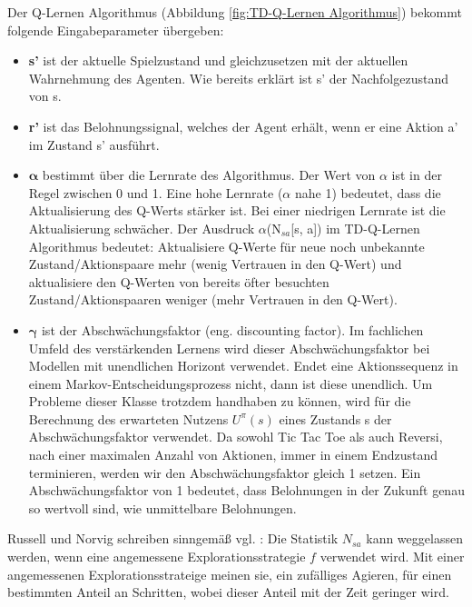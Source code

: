 Der Q-Lernen Algorithmus (Abbildung \ref{fig:TD-Q-Lernen Algorithmus}) bekommt folgende Eingabeparameter übergeben:

\begin{itemize}
\item \textbf{s'} ist der aktuelle Spielzustand und gleichzusetzen mit der aktuellen Wahrnehmung des Agenten. Wie bereits erklärt ist s' der Nachfolgezustand von s.

\item \textbf{r'} ist das Belohnungssignal, welches der Agent erhält, wenn er eine Aktion a' im Zustand s' ausführt. 

\item $\boldsymbol{\alpha}$ bestimmt über die Lernrate des Algorithmus. Der Wert von $\alpha$ ist in der Regel zwischen 0 und 1. Eine hohe Lernrate ($\alpha$ nahe 1) bedeutet, dass die Aktualisierung des Q-Werts stärker ist. Bei einer niedrigen Lernrate ist die Aktualisierung schwächer. Der Ausdruck $\alpha$(N$_{sa}$[s, a]) im TD-Q-Lernen Algorithmus bedeutet: Aktualisiere Q-Werte für neue noch unbekannte Zustand/Aktionspaare mehr (wenig Vertrauen in den Q-Wert) und aktualisiere den Q-Werten von bereits öfter besuchten Zustand/Aktionspaaren weniger (mehr Vertrauen in den Q-Wert). 
\newpage


\item $\boldsymbol{\gamma}$ ist der Abschwächungsfaktor (eng. discounting factor). Im fachlichen Umfeld des verstärkenden Lernens wird dieser Abschwächungsfaktor bei Modellen mit unendlichen Horizont verwendet. Endet eine Aktionssequenz in einem Markov-Entscheidungsprozess nicht, dann ist diese unendlich. Um Probleme dieser Klasse trotzdem handhaben zu können, wird für die Berechnung des erwarteten Nutzens $U^\pi(s)$ eines Zustands s der Abschwächungsfaktor verwendet. Da sowohl Tic Tac Toe als auch Reversi, nach einer maximalen Anzahl von Aktionen, immer in einem Endzustand terminieren, werden wir den Abschwächungsfaktor gleich 1 setzen. Ein Abschwächungsfaktor von 1 bedeutet, dass Belohnungen in der Zukunft genau so wertvoll sind, wie unmittelbare Belohnungen. 
\end{itemize} 

Russell und Norvig schreiben sinngemäß vgl. \cite[974]{Russell}: Die Statistik $N_{sa}$ kann weggelassen werden, wenn eine angemessene Explorationsstrategie $f$ verwendet wird. Mit einer angemessenen Explorationsstrateige meinen sie, ein zufälliges Agieren, für einen bestimmten Anteil an Schritten, wobei dieser Anteil mit der Zeit geringer wird. \\

